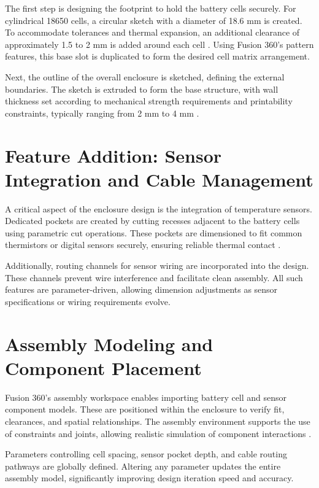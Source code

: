 The first step is designing the footprint to hold the battery cells securely. For cylindrical 18650 cells, a circular sketch with a diameter of 18.6 mm is created. To accommodate tolerances and thermal expansion, an additional clearance of approximately 1.5 to 2 mm is added around each cell \cite{pistoia2018}. Using Fusion 360’s pattern features, this base slot is duplicated to form the desired cell matrix arrangement.

Next, the outline of the overall enclosure is sketched, defining the external boundaries. The sketch is extruded to form the base structure, with wall thickness set according to mechanical strength requirements and printability constraints, typically ranging from 2 mm to 4 mm \cite{gebhardt2016}.

\section{Feature Addition: Sensor Integration and Cable Management}

A critical aspect of the enclosure design is the integration of temperature sensors. Dedicated pockets are created by cutting recesses adjacent to the battery cells using parametric cut operations. These pockets are dimensioned to fit common thermistors or digital sensors securely, ensuring reliable thermal contact \cite{anderson2020}.

Additionally, routing channels for sensor wiring are incorporated into the design. These channels prevent wire interference and facilitate clean assembly. All such features are parameter-driven, allowing dimension adjustments as sensor specifications or wiring requirements evolve.

\section{Assembly Modeling and Component Placement}

Fusion 360’s assembly workspace enables importing battery cell and sensor component models. These are positioned within the enclosure to verify fit, clearances, and spatial relationships. The assembly environment supports the use of constraints and joints, allowing realistic simulation of component interactions \cite{hogan2025}.

Parameters controlling cell spacing, sensor pocket depth, and cable routing pathways are globally defined. Altering any parameter updates the entire assembly model, significantly improving design iteration speed and accuracy.


